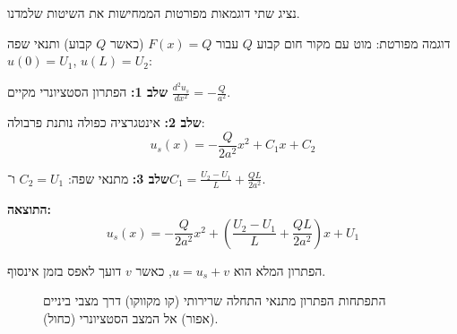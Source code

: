 נציג שתי דוגמאות מפורטות הממחישות את השיטות שלמדנו.

\begin{examplebox}{דוגמה מפורטת: מוט עם מקור חום קבוע $Q$}
עבור $F(x) = Q$ (כאשר $Q$ קבוע) ותנאי שפה $u(0)=U_1$, $u(L)=U_2$:

\textbf{שלב 1:} הפתרון הסטציונרי מקיים $\frac{d^2 u_s}{dx^2} = -\frac{Q}{a^2}$.

\textbf{שלב 2:} אינטגרציה כפולה נותנת פרבולה:
\begin{equation}
u_s(x) = -\frac{Q}{2a^2}x^2 + C_1 x + C_2
\end{equation}

\textbf{שלב 3:} מתנאי שפה: $C_2 = U_1$ ו־$C_1 = \frac{U_2-U_1}{L} + \frac{QL}{2a^2}$.

\textbf{התוצאה:}
\[
\boxed{u_s(x) = -\frac{Q}{2a^2}x^2 + \left(\frac{U_2-U_1}{L}+\frac{QL}{2a^2}\right)x + U_1}
\]

הפתרון המלא הוא $u = u_s + v$, כאשר $v$ דועך לאפס בזמן אינסוף.
\end{examplebox}

\begin{figure}[h]
\centering
{}
\caption{התפתחות הפתרון מתנאי התחלה שרירותי (קו מקווקו) דרך מצבי ביניים (אפור) אל המצב הסטציונרי (כחול).}
\end{figure}

